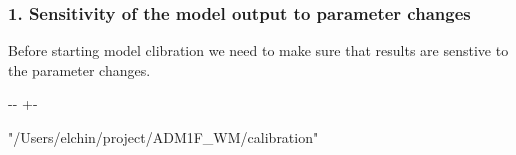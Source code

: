 \documentclass[a4paper,10pt,english]{sphinxmanual}
\newlength\nbsphinxcodecellspacing
\begin{document}
\subsubsection{1. Sensitivity of the model output to parameter changes}
\label{\detokenize{jupyter_notebook/parameter-calibration:1.-Sensitivity-of-the-model-output-to-parameter-changes}}
\sphinxAtStartPar
Before starting model clibration we need to make sure that results are senstive to the parameter changes.

{
\begin{sphinxVerbatim}[commandchars=\\\{\}]
\llap{\color{nbsphinxin}[2]:\,\hspace{\fboxrule}\hspace{\fboxsep}} 
 
 
\end{sphinxVerbatim}
}

{
\begin{sphinxVerbatim}[commandchars=\\\{\}]
\llap{\color{nbsphinxin}[3]:\,\hspace{\fboxrule}\hspace{\fboxsep}}
\end{sphinxVerbatim}
}

{

\kern-\sphinxverbatimsmallskipamount\kern-\baselineskip
\kern+\FrameHeightAdjust\kern-\fboxrule
\vspace{\nbsphinxcodecellspacing}

\begin{sphinxVerbatim}[commandchars=\\\{\}]
\llap{\color{nbsphinxout}[3]:\,\hspace{\fboxrule}\hspace{\fboxsep}}"/Users/elchin/project/ADM1F\_WM/calibration"
\end{sphinxVerbatim}
}
\end{document}
